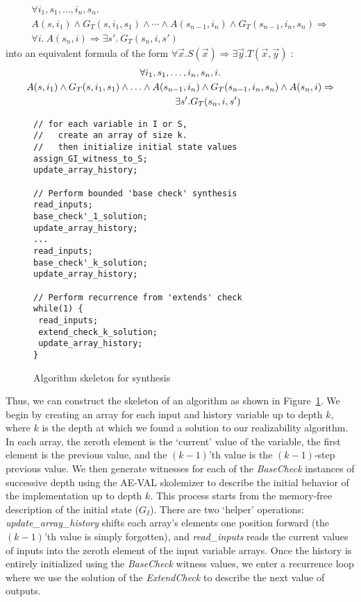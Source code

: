 \begin{multline*}
\forall i_1, s_1, \ldots, i_n, s_n.\\ A(s, i_1) \land G_T(s, i_1, s_1)
\land \cdots \land
A(s_{n-1}, i_n) \land G_T(s_{n-1}, i_n, s_n)
\Rightarrow \\
\forall i.~ A(s_n, i) \Rightarrow \exists s'.~ G_T(s_n, i, s')
\end{multline*}
into an equivalent formula of the form $\forall \vec{x}.
S(\vec{x}) \Rightarrow \exists \vec{y}. T(\vec{x},\vec{y})$ : 
\begin{multline}
	\label{ml:extendable2}
		\forall i_1,s_1,\ldots,i_n,s_n,i. \\
		A(s,i_1) \wedge G_T(s,i_1,s_1) \wedge \ldots \wedge
		A(s_{n-1}, i_n) \wedge G_T(s_{n-1},i_n,s_n) \wedge A(s_n,i) \Rightarrow \\
		\hspace{+2cm} \exists s'. G_T(s_n,i,s')
	\end{multline}

\begin{figure}
\begin{small}
\begin{verbatim}
// for each variable in I or S,
//   create an array of size k.
//   then initialize initial state values
assign_GI_witness_to_S;
update_array_history;

// Perform bounded 'base check' synthesis
read_inputs;
base_check'_1_solution;
update_array_history;
...
read_inputs;
base_check'_k_solution;
update_array_history;

// Perform recurrence from 'extends' check
while(1) {
 read_inputs;
 extend_check_k_solution;
 update_array_history;
}
\end{verbatim}
\end{small}
\caption{Algorithm skeleton for synthesis}
\label{fig:algorithm}
\end{figure}

\noindent

Thus, we can construct the skeleton of an algorithm as shown in Figure~\ref{fig:algorithm}.  
We begin by creating an array for each input and history variable up to depth
$k$, where $k$ is the depth at which we found a solution to our realizability algorithm.
In each array, the zeroth element is the `current' value of the variable, the first element is the previous value, and the $(k-1)$'th value is the $(k-1)$-step previous value.
We then generate witnesses for each of the {\em BaseCheck} instances of
successive depth using the AE-VAL skolemizer to describe the initial behavior of
the implementation up to depth $k$.  This process starts from the memory-free
description of the initial state ($G_I$).  There are two `helper' operations:
{\em update\_array\_history} shifts each array's elements one position forward
(the $(k-1)$'th value is simply forgotten), and {\em read\_inputs} reads the current values of inputs into the zeroth element of the input variable arrays.  Once the history is entirely initialized using the {\em BaseCheck} witness values, we enter a recurrence loop where we use the solution of the {\em ExtendCheck} to describe the next value of outputs.
 
